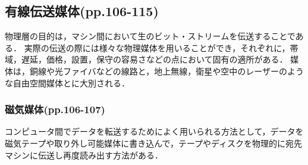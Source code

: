 \documentclass[a4paper]{ltjsarticle}
\begin{document}
  \subsection{有線伝送媒体(pp.106-115)}
    物理層の目的は，マシン間において生のビット・ストリームを伝送することである．
    実際の伝送の際には様々な物理媒体を用いることができ，それぞれに，帯域，遅延，価格，設置，保守の容易さなどの点において固有の適所がある．
    媒体は，銅線や光ファイバなどの線路と，地上無線，衛星や空中のレーザーのような自由空間媒体とに大別される．
    \subsubsection{磁気媒体(pp.106-107)}
			コンピュータ間でデータを転送するためによく用いられる方法として，データを磁気テープや取り外し可能媒体に書き込んで，テープやディスクを物理的に宛先マシンに伝送し再度読み出す方法がある．
\end{document}
